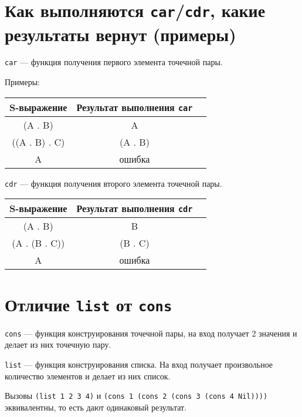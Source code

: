 \section{Как выполняются \texttt{car}/\texttt{cdr}, какие результаты вернут (примеры)}

\texttt{car} --- функция получения первого элемента точечной пары.

Примеры:

\begin{center}
    \begin{tabular}{ |c|c|c| } 
        \hline
            S-выражение & Результат выполнения \texttt{car} \\ 
        \hline
        \hline
            (A . B) & A \\ 
        \hline
            ((A . B) . C) & (A . B) \\ 
        \hline
            A & ошибка \\ 
        \hline
    \end{tabular}
\end{center}


\texttt{cdr} --- функция получения второго элемента точечной пары.

\begin{center}
    \begin{tabular}{ |c|c|c| } 
        \hline
            S-выражение & Результат выполнения \texttt{cdr} \\ 
        \hline
        \hline
            (A . B) & B \\ 
        \hline
            (A . (B . C)) & (B . C) \\ 
        \hline
            A & ошибка \\ 
        \hline
    \end{tabular}
\end{center}


\section{Отличие \texttt{list} от \texttt{cons}}

\texttt{cons} --- функция конструирования точечной пары, на вход получает 2 значения и делает из них точечную пару.

\texttt{list} --- функция конструирования списка. На вход получает произвольное количество элементов и делает из них список.

Вызовы \texttt{(list 1 2 3 4)} и \texttt{(cons 1 (cons 2 (cons 3 (cons 4 Nil))))} эквивалентны, то есть дают одинаковый результат.
